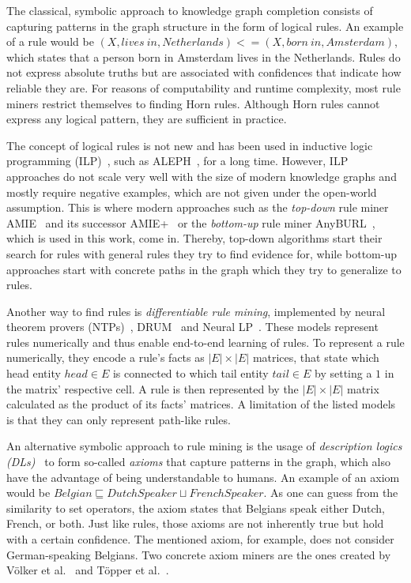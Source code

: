 The classical, symbolic approach to knowledge graph completion consists of capturing patterns in the graph structure in the form of logical rules. An example of a rule would be $(X, lives~in, Netherlands) <= (X, born~in, Amsterdam)$, which states that a person born in Amsterdam lives in the Netherlands. Rules do not express absolute truths but are associated with confidences that indicate how reliable they are. For reasons of computability and runtime complexity, most rule miners restrict themselves to finding Horn rules. Although Horn rules cannot express any logical pattern, they are sufficient in practice.

The concept of logical rules is not new and has been used in inductive logic programming (ILP)~\cite{Muggleton1994InductiveLP}, such as ALEPH~\cite{ALEPH}, for a long time. However, ILP approaches do not scale very well with the size of modern knowledge graphs and mostly require negative examples, which are not given under the open-world assumption. This is where modern approaches such as the \emph{top-down} rule miner AMIE~\cite{Galrraga2013AMIEAR} and its successor AMIE+~\cite{Galrraga2015FastRM} or the \emph{bottom-up} rule miner AnyBURL~\cite{Meilicke2019AnytimeBR}, which is used in this work, come in. Thereby, top-down algorithms start their search for rules with general rules they try to find evidence for, while bottom-up approaches start with concrete paths in the graph which they try to generalize to rules.

Another way to find rules is \emph{differentiable rule mining}, implemented by neural theorem provers (NTPs)~\cite{Rocktschel2017EndtoendDP}, DRUM~\cite{Sadeghian2019DRUMED} and Neural LP~\cite{Yang2017DifferentiableLO}. These models represent rules numerically and thus enable end-to-end learning of rules. To represent a rule numerically, they encode a rule's facts as $|E| \times |E|$ matrices, that state which head entity $head \in E$ is connected to which tail entity $tail \in E$ by setting a $1$ in the matrix' respective cell. A rule is then represented by the $|E| \times |E|$ matrix calculated as the product of its facts' matrices. A limitation of the listed models is that they can only represent path-like rules.

An alternative symbolic approach to rule mining is the usage of \emph{description logics (DLs)}~\cite{Baader2003TheDL} to form so-called \emph{axioms} that capture patterns in the graph, which also have the advantage of being understandable to humans. An example of an axiom would be $Belgian \sqsubseteq DutchSpeaker \sqcup FrenchSpeaker$. As one can guess from the similarity to set operators, the axiom states that Belgians speak either Dutch, French, or both. Just like rules, those axioms are not inherently true but hold with a certain confidence. The mentioned axiom, for example, does not consider German-speaking Belgians. Two concrete axiom miners are the ones created by Völker et al.~\cite{Vlker2015AutomaticAO} and Töpper et al.~\cite{Tpper2012DBpediaOE}.
